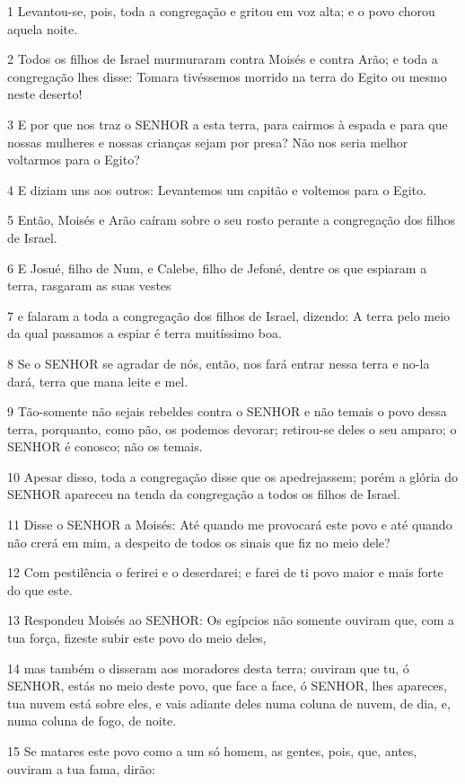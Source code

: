 \par 1 Levantou-se, pois, toda a congregação e gritou em voz alta; e o povo chorou aquela noite.
\par 2 Todos os filhos de Israel murmuraram contra Moisés e contra Arão; e toda a congregação lhes disse: Tomara tivéssemos morrido na terra do Egito ou mesmo neste deserto!
\par 3 E por que nos traz o SENHOR a esta terra, para cairmos à espada e para que nossas mulheres e nossas crianças sejam por presa? Não nos seria melhor voltarmos para o Egito?
\par 4 E diziam uns aos outros: Levantemos um capitão e voltemos para o Egito.
\par 5 Então, Moisés e Arão caíram sobre o seu rosto perante a congregação dos filhos de Israel.
\par 6 E Josué, filho de Num, e Calebe, filho de Jefoné, dentre os que espiaram a terra, rasgaram as suas vestes
\par 7 e falaram a toda a congregação dos filhos de Israel, dizendo: A terra pelo meio da qual passamos a espiar é terra muitíssimo boa.
\par 8 Se o SENHOR se agradar de nós, então, nos fará entrar nessa terra e no-la dará, terra que mana leite e mel.
\par 9 Tão-somente não sejais rebeldes contra o SENHOR e não temais o povo dessa terra, porquanto, como pão, os podemos devorar; retirou-se deles o seu amparo; o SENHOR é conosco; não os temais.
\par 10 Apesar disso, toda a congregação disse que os apedrejassem; porém a glória do SENHOR apareceu na tenda da congregação a todos os filhos de Israel.
\par 11 Disse o SENHOR a Moisés: Até quando me provocará este povo e até quando não crerá em mim, a despeito de todos os sinais que fiz no meio dele?
\par 12 Com pestilência o ferirei e o deserdarei; e farei de ti povo maior e mais forte do que este.
\par 13 Respondeu Moisés ao SENHOR: Os egípcios não somente ouviram que, com a tua força, fizeste subir este povo do meio deles,
\par 14 mas também o disseram aos moradores desta terra; ouviram que tu, ó SENHOR, estás no meio deste povo, que face a face, ó SENHOR, lhes apareces, tua nuvem está sobre eles, e vais adiante deles numa coluna de nuvem, de dia, e, numa coluna de fogo, de noite.
\par 15 Se matares este povo como a um só homem, as gentes, pois, que, antes, ouviram a tua fama, dirão:
